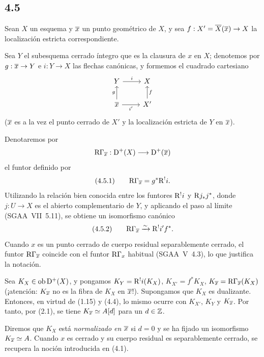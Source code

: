 \subsection*{4.5}
Sean $X$ un esquema y $\overline{x}$ un punto geométrico de $X$, y sea $f:X'=\overline{X}(\overline{x})\to X$ la localización estricta correspondiente.

Sea $Y$ el subesquema cerrado íntegro que es la clausura de $x$ en $X$; denotemos por $g:\overline{x}\to Y$ e $i:Y\to X$ las flechas canónicas, y formemos el cuadrado cartesiano
\[
\begin{tikzcd}
Y \arrow[r,"i"] & X \\
\ol{x} \arrow[u,"g"] \arrow[r,"i'"'] & X' \arrow[u,"f"']
\end{tikzcd}
\]
($\overline{x}$ es a la vez el punto cerrado de $X'$ y la localización estricta de $Y$ en $\overline{x}$).

Denotaremos por
\[
\mathrm{R}\Gamma_{\overline{x}}:\mathrm{D}^+(X)\longrightarrow \mathrm{D}^+(\overline{x})
\]
el funtor definido por
\[
(4.5.1)\qquad \mathrm{R}\Gamma_{\overline{x}}=g^*\mathrm{R}^{!}i.
\]
Utilizando la relación bien conocida entre los funtores $\mathrm{R}^{!}i$ y $\mathrm{R} j_*j^*$, donde $j:U\to X$ es el abierto complementario de $Y$, y aplicando el paso al límite (SGAA~VII~5.11), se obtiene un isomorfismo canónico
\[
(4.5.2)\qquad \mathrm{R}\Gamma_{\overline{x}}\xrightarrow{\sim}\mathrm{R}^{!}i' f^*.
\]
Cuando $x$ es un punto cerrado de cuerpo residual separablemente cerrado, el funtor $\mathrm{R}\Gamma_{\overline{x}}$ coincide con el funtor $\mathrm{R}\Gamma_x$ habitual (SGAA~V~4.3), lo que justifica la notación.

Sea $K_X\in\operatorname{ob}\mathrm{D}^+(X)$, y pongamos $K_Y=\mathrm{R}^{!}i(K_X)$, $K_{X'}=f^*K_X$, $K_{\overline{x}}=\mathrm{R}\Gamma_{\overline{x}}(K_X)$ (¡atención: $K_{\overline{x}}$ no es la fibra de $K_X$ en $\overline{x}$!). Supongamos que $K_X$ es dualizante. Entonces, en virtud de (1.15) y (4.4), lo mismo ocurre con $K_{X'}$, $K_Y$ y $K_{\overline{x}}$. Por tanto, por (2.1), se tiene $K_{\overline{x}}\simeq A[d]$ para un $d\in\mathbb{Z}$.

Diremos que $K_X$ está \emph{normalizado en $\overline{x}$} si $d=0$ y se ha fijado un isomorfismo $K_{\overline{x}}\simeq A$. Cuando $x$ es cerrado y su cuerpo residual es separablemente cerrado, se recupera la noción introducida en (4.1).


